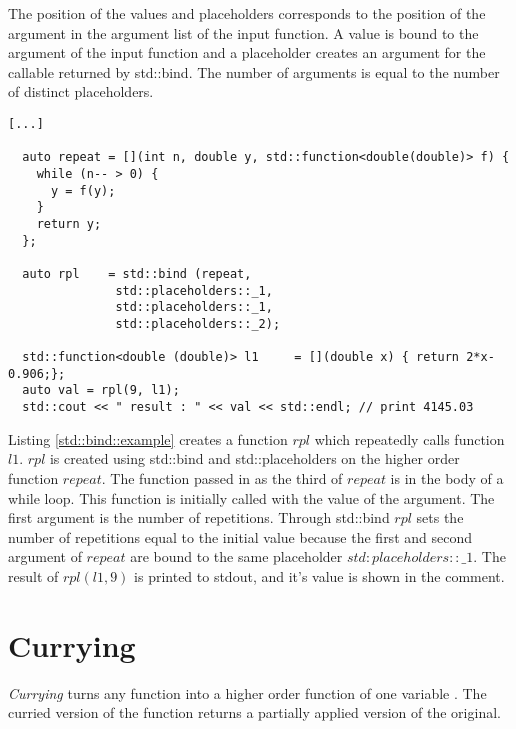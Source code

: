 \documentclass[12pt,fleqn]{article}
\begin{document}
The position of the values and placeholders corresponds to the position of the argument in the argument list of the input function. 
A value is bound to the argument of the input function and a placeholder creates an argument for the callable returned by std::bind.
The number of arguments is equal to the number of distinct placeholders.
%
\begin{lstlisting}[caption=std::bind example, label=std::bind::example]
[...]
 
  auto repeat = [](int n, double y, std::function<double(double)> f) { 
    while (n-- > 0) {
      y = f(y);
    }
    return y;
  };

  auto rpl    = std::bind (repeat,
			   std::placeholders::_1,
			   std::placeholders::_1,
			   std::placeholders::_2);

  std::function<double (double)> l1     = [](double x) { return 2*x-0.906;};
  auto val = rpl(9, l1);
  std::cout << " result : " << val << std::endl; // print 4145.03

\end{lstlisting}
%
Listing \ref{std::bind::example} creates a function $rpl$ which repeatedly calls function $l1$. 
$rpl$ is created using std::bind and std::placeholders on the higher order function $repeat$.
The function passed in as the third of $repeat$ is in the body of a while loop. 
This function is initially called with the value of the  argument.
The first argument is the number of repetitions.
Through std::bind $rpl$ sets the number of repetitions equal to the initial value because the first and second argument of $repeat$ are bound to the same placeholder $std:placeholders::\_1$. 
The result of $rpl(l1,9)$  is printed to stdout, and it's value is shown in the comment.
\section*{Currying}
{\em Currying} turns any function into a higher order function of one variable \cite{field}.
The curried version of the function returns a partially applied version of the original.
\end{document}
